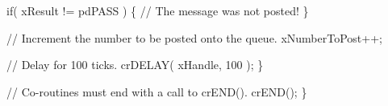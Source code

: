 \begin{DoxyPre}       if( xResult != pdPASS )
       \{
           // The message was not posted!
       \}\end{DoxyPre}



\begin{DoxyPre}       // Increment the number to be posted onto the queue.
       xNumberToPost++;\end{DoxyPre}



\begin{DoxyPre}       // Delay for 100 ticks.
       crDELAY( xHandle, 100 );
   \}\end{DoxyPre}



\begin{DoxyPre}   // Co-routines must end with a call to crEND().
   crEND();
\}\end{DoxyPre}
 